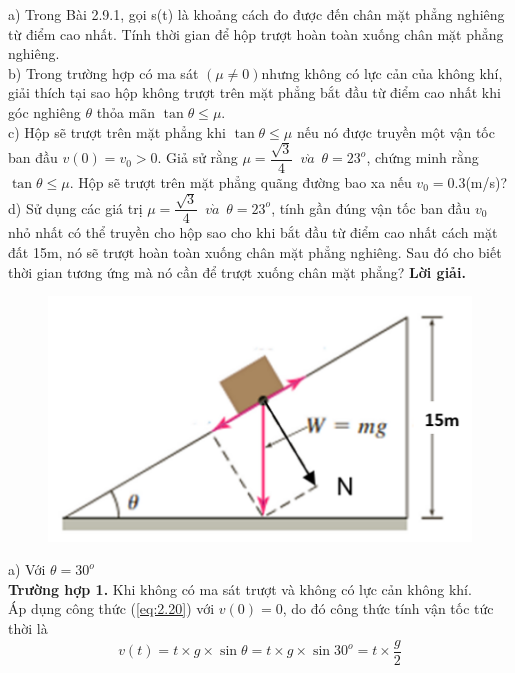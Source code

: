a) Trong Bài 2.9.1, gọi s(t) là khoảng cách đo được đến chân mặt phẳng nghiêng từ điểm cao nhất. Tính thời gian để hộp trượt hoàn toàn xuống chân mặt phẳng nghiêng. \\
b) Trong trường hợp có ma sát $\left( \mu \ne 0 \right)$nhưng không có lực cản của không khí, giải thích tại sao hộp không trượt trên mặt phẳng bắt đầu từ điểm cao nhất khi góc nghiêng $\theta $ thỏa mãn $\tan \theta \le \mu $.\\
c) Hộp sẽ trượt trên mặt phẳng khi $\tan \theta \le \mu $ nếu nó được truyền một vận tốc ban đầu $v(0)={{v}_{0}}>0$. Giả sử rằng $\mu =\dfrac{\sqrt{3}}{4}\,\,\,v\grave{a}\,\,\,\theta ={{23}^{o}}$, chứng minh rằng $\tan \theta \le \mu $. Hộp sẽ trượt trên mặt phẳng quãng đường bao xa nếu ${{v}_{0}}=0.3$(m/s)?\\
d) Sử dụng các giá trị $\mu =\dfrac{\sqrt{3}}{4}\,\,\,v\grave{a}\,\,\,\theta ={{23}^{o}}$, tính gần đúng vận tốc ban đầu ${{v}_{0}}$ nhỏ nhất có thể truyền cho hộp sao cho khi bắt đầu từ điểm cao nhất cách mặt đất 15m, nó sẽ trượt hoàn toàn xuống chân mặt phẳng nghiêng. Sau đó cho biết thời gian tương ứng mà nó cần để trượt xuống chân mặt phẳng?\newpage
\textbf{Lời giải. }
\begin{figure}[H]
	\centering
	\includegraphics[scale=0.6]{Images/nocaption.png}
\end{figure}   
\noindent a) Với $\theta ={{30}^{o}}$\\
\textbf{Trường hợp 1.}  Khi không có ma sát trượt và không có lực cản không khí.\\
Áp dụng công thức (\ref{eq:2.20}) với $v(0)=0$, do đó công thức tính vận tốc tức thời là 
$$v(t)=t\times g\times \sin \theta =t\times g\times \sin {{30}^{o}}=t\times \dfrac{g}{2}$$
